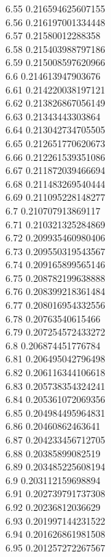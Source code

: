{6.55	0.216594625607155\\
6.56	0.216197001334448\\
6.57	0.21580012288358\\
6.58	0.215403988797186\\
6.59	0.215008597620966\\
6.6	0.214613947903676\\
6.61	0.214220038197121\\
6.62	0.213826867056149\\
6.63	0.21343443303864\\
6.64	0.213042734705505\\
6.65	0.212651770620673\\
6.66	0.212261539351086\\
6.67	0.211872039466694\\
6.68	0.211483269540444\\
6.69	0.211095228148277\\
6.7	0.210707913869117\\
6.71	0.210321325284869\\
6.72	0.209935460980406\\
6.73	0.209550319543567\\
6.74	0.209165899565146\\
6.75	0.208782199638888\\
6.76	0.208399218361484\\
6.77	0.208016954332556\\
6.78	0.20763540615466\\
6.79	0.207254572433272\\
6.8	0.206874451776784\\
6.81	0.206495042796498\\
6.82	0.206116344106618\\
6.83	0.205738354324241\\
6.84	0.205361072069356\\
6.85	0.204984495964831\\
6.86	0.20460862463641\\
6.87	0.204233456712705\\
6.88	0.20385899082519\\
6.89	0.203485225608194\\
6.9	0.203112159698894\\
6.91	0.202739791737308\\
6.92	0.20236812036629\\
6.93	0.201997144231522\\
6.94	0.201626861981508\\
6.95	0.201257272267567\\
}
